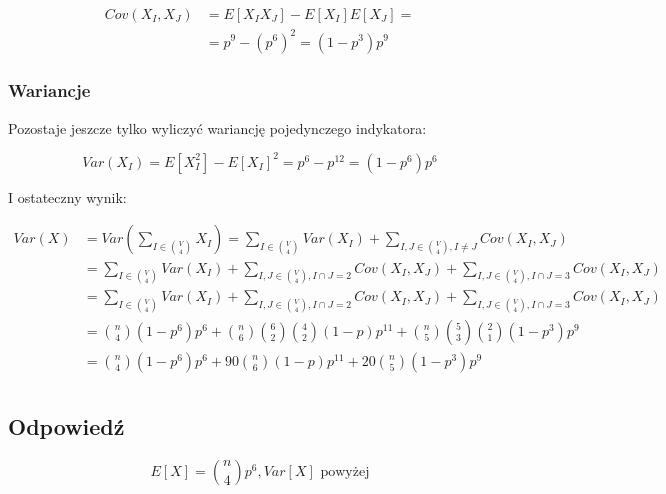 \begin{align*}
	Cov(X_I, X_J) & = E[X_IX_J] - E[X_I]E[X_J] = \\
	              & = p^9 - (p^6)^2 = (1-p^3)p^9
\end{align*}

\subsubsection*{Wariancje}

Pozostaje jeszcze tylko wyliczyć wariancję pojedynczego indykatora:

\[
	Var(X_I) = E[X_I^2] - E[X_I]^2 = p^6 - p^{12} = (1-p^6)p^6
\]

I ostateczny wynik:

\begin{align*}
	Var(X) & = Var(\sum_{I \in \binom V 4}X_I) = \sum_{I \in \binom V 4}Var(X_I) + \sum_{I, J \in \binom V 4, I \neq J}Cov(X_I, X_J)                           \\
	       & = \sum_{I \in \binom V 4}Var(X_I) + \sum_{I, J \in \binom V 4, I \cap J = 2}Cov(X_I, X_J) + \sum_{I, J \in \binom V 4, I \cap J = 3}Cov(X_I, X_J) \\
	       & = \sum_{I \in \binom V 4}Var(X_I) + \sum_{I, J \in \binom V 4, I \cap J = 2}Cov(X_I, X_J) + \sum_{I, J \in \binom V 4, I \cap J = 3}Cov(X_I, X_J) \\
	       & = \binom{n}{4}(1-p^6)p^6 + \binom{n}{6}\binom{6}{2}\binom{4}{2}(1-p)p^{11} + \binom{n}{5}\binom{5}{3}\binom{2}{1}(1-p^3)p^9                       \\
	       & = \binom{n}{4}(1-p^6)p^6 + 90\binom{n}{6}(1-p)p^{11} + 20\binom{n}{5}(1-p^3)p^9                                                                   \\
\end{align*}

\subsection*{Odpowiedź}
\[
	\boxed{E[X] = \binom{n}{4}p^6, Var[X] \text{ powyżej}}
\]
